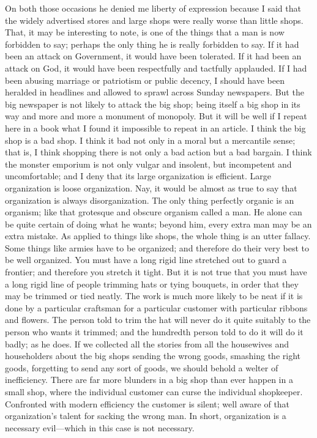 \documentclass{book}
\begin{document}
On both those occasions he denied me liberty of expression because I said that the widely advertised stores and large shops were really worse than little shops. That, it may be interesting to note, is one of the things that a man is now forbidden to say; perhaps the only thing he is really forbidden to say. If it had been an attack on Government, it would have been tolerated. If it had been an attack on God, it would have been respectfully and tactfully applauded. If I had been abusing marriage or patriotism or public decency, I should have been heralded in headlines and allowed to sprawl across Sunday newspapers. But the big newspaper is not likely to attack the big shop; being itself a big shop in its way and more and more a monument of monopoly. But it will be well if I repeat here in a book what I found it impossible to repeat in an article. I think the big shop is a bad shop. I think it bad not only in a moral but a mercantile sense; that is, I think shopping there is not only a bad action but a bad bargain. I think the monster emporium is not only vulgar and insolent, but incompetent and uncomfortable; and I deny that its large organization is efficient. Large organization is loose organization. Nay, it would be almost as true to say that organization is always disorganization. The only thing perfectly organic is an organism; like that grotesque and obscure organism called a man. He alone can be quite certain of doing what he wants; beyond him, every extra man may be an extra mistake. As applied to things like shops, the whole thing is an utter fallacy. Some things like armies have to be organized; and therefore do their very best to be well organized. You must have a long rigid line stretched out to guard a frontier; and therefore you stretch it tight. But it is not true that you must have a long rigid line of people trimming hats or tying bouquets, in order that they may be trimmed or tied neatly. The work is much more likely to be neat if it is done by a particular craftsman for a particular customer with particular ribbons and flowers. The person told to trim the hat will never do it quite suitably to the person who wants it trimmed; and the hundredth person told to do it will do it badly; as he does. If we collected all the stories from all the housewives and householders about the big shops sending the wrong goods, smashing the right goods, forgetting to send any sort of goods, we should behold a welter of inefficiency. There are far more blunders in a big shop than ever happen in a small shop, where the individual customer can curse the individual shopkeeper. Confronted with modern efficiency the customer is silent; well aware of that organization’s talent for sacking the wrong man. In short, organization is a necessary evil—which in this case is not necessary.
\end{document}
